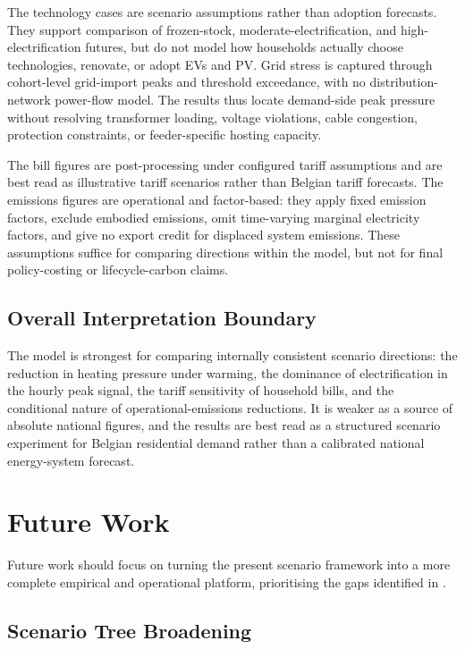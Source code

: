 The technology cases are scenario assumptions rather than adoption forecasts. They support comparison of frozen-stock, moderate-electrification, and high-electrification futures, but do not model how households actually choose technologies, renovate, or adopt EVs and PV.
\newline Grid stress is captured through cohort-level grid-import peaks and threshold exceedance, with no distribution-network power-flow model. The results thus locate demand-side peak pressure without resolving transformer loading, voltage violations, cable congestion, protection constraints, or feeder-specific hosting capacity.

The bill figures are post-processing under configured tariff assumptions and are best read as illustrative tariff scenarios rather than Belgian tariff forecasts. The emissions figures are operational and factor-based: they apply fixed emission factors, exclude embodied emissions, omit time-varying marginal electricity factors, and give no export credit for displaced system emissions. These assumptions suffice for comparing directions within the model, but not for final policy-costing or lifecycle-carbon claims.


\subsection{Overall Interpretation Boundary}
\label{sec:limitationsInterpretationBoundary}

The model is strongest for comparing internally consistent scenario directions:
the reduction in heating pressure under warming, the dominance of electrification
in the hourly peak signal, the tariff sensitivity of household bills, and the
conditional nature of operational-emissions reductions. It is weaker as a source
of absolute national figures, and the results are best read as a structured
scenario experiment for Belgian residential demand rather than a calibrated
national energy-system forecast.


\pagebreak
\section{Future Work}\label{sec:futurework}

Future work should focus on turning the present scenario framework into a more
complete empirical and operational platform, prioritising the gaps identified in
.


\subsection{Scenario Tree Broadening}
\label{sec:futureworkScenarioTree}

